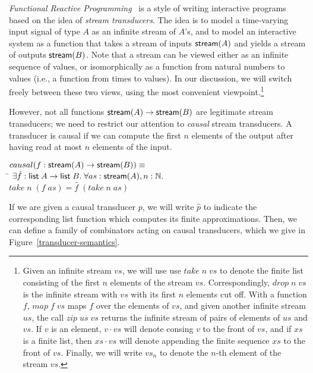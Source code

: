 \emph{Functional Reactive Programming}~\cite{frp} is a style of
writing interactive programs based on the idea of \emph{stream
  transducers}.  The idea is to model a time-varying input signal of
type $A$ as an infinite stream of $A$'s, and to model an interactive
system as a function that takes a stream of inputs $\mathsf{stream}({A})$ and
yields a stream of outputs $\mathsf{stream}({B})$. Note that a stream can be
viewed either as an infinite sequence of values, or isomorphically as
a function from natural numbers to values (i.e., a function from times
to values). In our discussion, we will switch freely between these two
views, using the most convenient viewpoint.\footnote{Given an infinite stream $vs$, we will use use $take\;n\;vs$ to denote
the finite list consisting of the first $n$ elements of the stream
$vs$. Correspondingly, $drop\;n\;vs$ is the infinite stream with $vs$
with its first $n$ elements cut off. With a function $f$, $map\;f\;vs$
maps $f$ over the elements of $vs$, and given another infinite stream
$us$, the call $zip\;us\;vs$ returns the infinite stream of pairs of
elements of $us$ and $vs$. If $v$ is an element, $v \cdot vs$ will 
denote consing $v$ to the front of $vs$, and if $xs$ is a finite list, then
$xs \cdot vs$ will denote appending the finite sequence $xs$ to the
front of $vs$. Finally, we will write $vs_n$ to denote the $n$-th element
of the stream $vs$.}

However, not all functions $\mathsf{stream}({A}) \to \mathsf{stream}({B})$ are legitimate
stream transducers; we need to restrict our attention to \emph{causal}
stream transducers. A transducer is causal if we can compute the first
$n$ elements of the output after having read at most $n$ elements of
the input. 

\begin{tabbing}
$causal(f : \mathsf{stream}({A}) \to \mathsf{stream}({B})) \equiv$ \\
\;\;\= $\exists \hat{f} : \mathsf{list}\;{A} \to \mathsf{list}\;{B}.\;\forall as:\mathsf{stream}({A}), n:\mathbb{N}.$ \\
    \> \;\;$take\;n\;(f\;as) = \hat{f}\;(take\;n\;as)$ 
\end{tabbing}

If we are given a causal transducer $p$, we will write $\hat{p}$ to
indicate the corresponding list function which computes its finite
approximations. Then, we can define a family of combinators acting on
causal transducers, which we give in Figure~\ref{transducer-semantics}.

